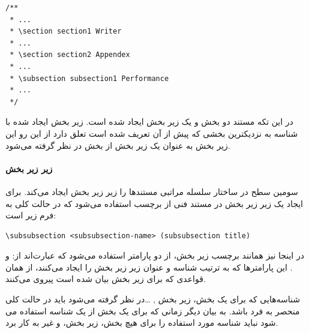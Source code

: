 \begin{latin}
\lstset{language=C++}  
\begin{lstlisting}[frame=single] 
/**
 * ...
 * \section section1 Writer
 * ...
 * \section section2 Appendex
 * ...
 * \subsection subsection1 Performance
 * ...
 */
\end{lstlisting}
\end{latin}

در این تکه مستند دو بخش و یک زیر بخش ایجاد شده است. زیر بخش ایجاد شده با شناسه
 به نزدیکترین بخشی که پیش از آن تعریف شده است تعلق دارد از این
رو این زیر بخش به عنوان یک زیر بخش از بخش  در نظر گرفته می‌شود.

\paragraph{زیر زیر بخش}

سومین سطح در ساختار سلسله مراتبی مستندها را زیر زیر
بخش ایجاد می‌کند. برای ایجاد یک زیر زیر بخش در مستند
فنی از برچسب  استفاده می‌شود که در حالت کلی به فرم زیر است:

\begin{latin}
\lstset{language=C++}  
\begin{lstlisting}[frame=single] 
\subsubsection <subsubsection-name> (subsubsection title)
\end{lstlisting}
\end{latin}

در اینجا نیز همانند برچسب زیر بخش، از دو پارامتر استفاده می‌شود که عبارت‌اند از:
 و . این پارامترها که به ترتیب
شناسه و عنوان زیر زیر بخش را ایجاد می‌کنند، از همان قواعدی که برای زیر بخش بیان
شده است پیروی می‌کنند.

\begin{warning}
شناسه‌هایی که برای یک بخش، زیر بخش , \ldots در نظر گرفته می‌شود باید در حالت کلی
منحصر به فرد باشد. به بیان دیگر زمانی که برای یک بخش از یک شناسه استفاده می شود
نباید شناسه مورد استفاده را برای هیچ بخش، زیر بخش، و غیر به کار برد.
\end{warning}

